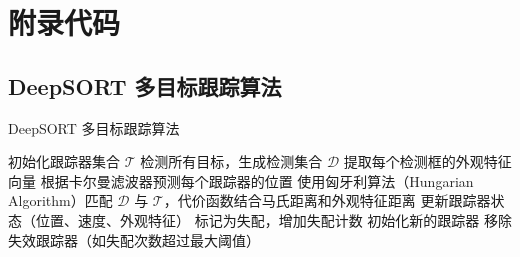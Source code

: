 \chapter{附录代码}

\section{DeepSORT 多目标跟踪算法}

\begin{algorithm}[h]
    \caption{DeepSORT 多目标跟踪算法}\label{alg:ovf}
    \begin{algorithmic}[1]
		\STATE 初始化跟踪器集合 $\mathcal{T}$
		    \STATE 检测所有目标，生成检测集合 $\mathcal{D}$
		    \STATE 提取每个检测框的外观特征向量
		    \STATE 根据卡尔曼滤波器预测每个跟踪器的位置
		    \STATE 使用匈牙利算法（Hungarian Algorithm）匹配 $\mathcal{D}$ 与 $\mathcal{T}$，代价函数结合马氏距离和外观特征距离
		        \STATE 更新跟踪器状态（位置、速度、外观特征）
		    \ENDFOR
		        \STATE 标记为失配，增加失配计数
		    \ENDFOR
		        \STATE 初始化新的跟踪器
		    \ENDFOR
		    \STATE 移除失效跟踪器（如失配次数超过最大阈值）
		\ENDFOR
    \end{algorithmic}
\end{algorithm}

